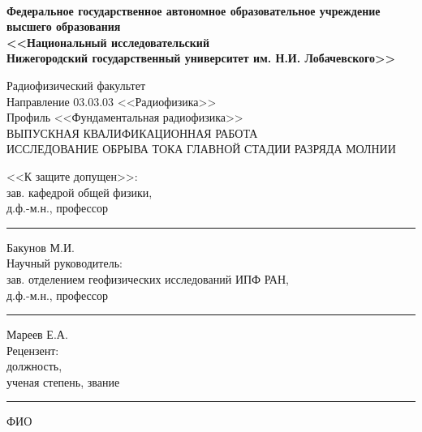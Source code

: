 \usepackage{setspace,pythonhighlight}
\usepackage{geometry}
\geometry{left=30mm,right=10mm,top=20mm,bottom=25mm,bindingoffset=0cm,headheight=15pt}



\begin{titlepage}
\begin{spacing}{1}
	\fontsize{11pt}{11pt} \selectfont
	{\centering
	\linespread{1}
	\\[13pt]
	\begin{spacing}{1.5}
		{\fontsize{12pt}{12pt} \selectfont\bf  Федеральное государственное автономное образовательное учреждение \\[-0.27em]
		высшего образования \\[-0.3em]
		<<Национальный исследовательский \\[-0.72em] Нижегородский
		государственный университет им. Н.И. Лобачевского>>
		}\\[4.5pt] 
	\end{spacing}
	\fontsize{12pt}{12pt} \selectfont
	Радиофизический факультет\\[16pt]
	Направление 03.03.03 <<Радиофизика>>\\[5pt]
	Профиль <<Фундаментальная радиофизика>>\\
	\vspace{30pt}
	ВЫПУСКНАЯ КВАЛИФИКАЦИОННАЯ РАБОТА\\
	\vspace{34pt}
	{{
	ИССЛЕДОВАНИЕ ОБРЫВА ТОКА ГЛАВНОЙ СТАДИИ РАЗРЯДА МОЛНИИ
	}}\\
	\vspace{34pt}}\fontsize{12pt}{12pt} \selectfont
	\noindent <<К защите допущен>>:\\[15pt]
	зав. кафедрой общей физики,\\[0.4em]
	д.ф.-м.н., профессор\hfill \rule{2cm}{1pt} Бакунов М.И. \hphantom{a\!a}\\[15pt]
	Научный руководитель:\\[0.4em]
	зав. отделением геофизических исследований ИПФ РАН,\\[0.4em] д.ф.-м.н., профессор\hfill \rule{2cm}{1pt} Мареев Е.А. \hphantom{aaa\,}\\[15pt]
	Рецензент:\\[0.4em]
	должность,\\[0.4em] ученая степень, звание\hfill \rule{2cm}{1pt} ФИО\hphantom{aaaaaaaaaa,}\\[30pt]

\end{spacing}
\end{titlepage}
